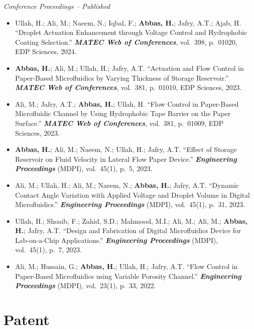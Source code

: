 \documentclass[11pt,a4paper]{article}
\begin{document}
\vspace{4pt}
\textit{Conference Proceedings -- Published}
\begin{itemize}
  \item Ullah, H.; Ali, M.; Naeem, N.; Iqbal, F.; \textbf{Abbas, H.}; Jafry,
        A.T.; Ajab, H. ``Droplet Actuation Enhancement through Voltage Control
        and Hydrophobic Coating Selection.''
        \textbf{\textit{MATEC Web of Conferences}}, vol.~398, p.~01020, EDP
        Sciences, 2024.
  \item \textbf{Abbas, H.}; Ali, M.; Ullah, H.; Jafry, A.T. ``Actuation and
        Flow Control in Paper-Based Microfluidics by Varying Thickness of Storage
        Reservoir.''
        \textbf{\textit{MATEC Web of Conferences}}, vol.~381, p.~01010, EDP
        Sciences, 2023.
  \item Ali, M.; Jafry, A.T.; \textbf{Abbas, H.}; Ullah, H. ``Flow Control in
        Paper-Based Microfluidic Channel by Using Hydrophobic Tape Barrier on the
        Paper Surface.''
        \textbf{\textit{MATEC Web of Conferences}}, vol.~381, p.~01009, EDP
        Sciences, 2023.
  \item \textbf{Abbas, H.}; Ali, M.; Naeem, N.; Ullah, H.; Jafry, A.T. ``Effect
        of Storage Reservoir on Fluid Velocity in Lateral Flow Paper Device.''
        \textbf{\textit{Engineering Proceedings}} (MDPI), vol.~45(1), p.~5, 2023.
  \item Ali, M.; Ullah, H.; Ali, M.; Naeem, N.; \textbf{Abbas, H.}; Jafry, A.T.
        ``Dynamic Contact Angle Variation with Applied Voltage and Droplet Volume
        in Digital Microfluidics.''
        \textbf{\textit{Engineering Proceedings}} (MDPI), vol.~45(1), p.~31,
        2023.
  \item Ullah, H.; Shoaib, F.; Zahid, S.D.; Mahmood, M.I.; Ali, M.; Ali, M.;
        \textbf{Abbas, H.}; Jafry, A.T. ``Design and Fabrication of Digital
        Microfluidics Device for Lab-on-a-Chip Applications.''
        \textbf{\textit{Engineering Proceedings}} (MDPI), vol.~45(1), p.~7, 2023.
  \item Ali, M.; Hussain, G.; \textbf{Abbas, H.}; Ullah, H.; Jafry, A.T. ``Flow
        Control in Paper-Based Microfluidics using Variable Porosity Channel.''
        \textbf{\textit{Engineering Proceedings}} (MDPI), vol.~23(1), p.~33,
        2022.
\end{itemize}

\section{Patent}
\end{document}
